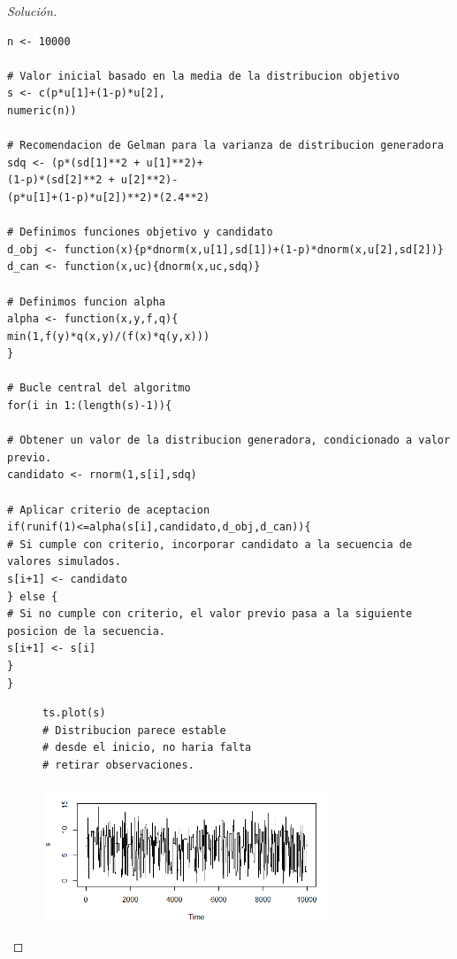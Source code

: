 \documentclass[11pt]{article}
\renewcommand{\=}[1]{\stackrel{#1}{=}} %
\newenvironment{sol}
{\begin{proof}[Solución]}
	{\end{proof}}
\theoremstyle{definition}
\theoremstyle{remark}
\begin{document}
\begin{itemize}
\begin{sol} $ $
	
		{
	\begin{lstlisting}[style=myRstyle, caption={Algoritmo de Metropolis-Hastings.}]
n <- 10000

# Valor inicial basado en la media de la distribucion objetivo
s <- c(p*u[1]+(1-p)*u[2],
numeric(n))

# Recomendacion de Gelman para la varianza de distribucion generadora
sdq <- (p*(sd[1]**2 + u[1]**2)+
(1-p)*(sd[2]**2 + u[2]**2)-
(p*u[1]+(1-p)*u[2])**2)*(2.4**2)

# Definimos funciones objetivo y candidato
d_obj <- function(x){p*dnorm(x,u[1],sd[1])+(1-p)*dnorm(x,u[2],sd[2])}
d_can <- function(x,uc){dnorm(x,uc,sdq)}

# Definimos funcion alpha
alpha <- function(x,y,f,q){
min(1,f(y)*q(x,y)/(f(x)*q(y,x)))
}

# Bucle central del algoritmo
for(i in 1:(length(s)-1)){

# Obtener un valor de la distribucion generadora, condicionado a valor previo.
candidato <- rnorm(1,s[i],sdq)

# Aplicar criterio de aceptacion
if(runif(1)<=alpha(s[i],candidato,d_obj,d_can)){
# Si cumple con criterio, incorporar candidato a la secuencia de valores simulados.
s[i+1] <- candidato
} else {
# Si no cumple con criterio, el valor previo pasa a la siguiente posicion de la secuencia.
s[i+1] <- s[i]
}
}
	\end{lstlisting}
}			
	\begin{figure}[h]
		
	\hspace*{0.9cm}\begin{minipage}{7.3cm}
		{
			\begin{lstlisting}[style=myRstyle, caption={Revisión del gráfico de cadena / MN.}]
ts.plot(s)
# Distribucion parece estable
# desde el inicio, no haria falta
# retirar observaciones.

			\end{lstlisting}
		}			
	\end{minipage}
	\begin{minipage}{6cm}
		\includegraphics[width=8.5cm]{cad}
	\end{minipage}
\end{figure}


\end{sol}
\end{itemize}
\end{document}

